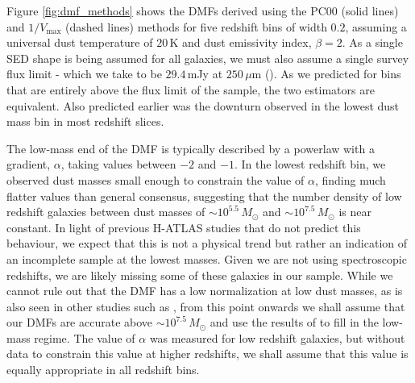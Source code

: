 Figure \ref{fig:dmf_methods} shows the DMFs derived using the PC00 (solid lines) and $1/V_{\textrm{max}}$ (dashed lines) methods for five redshift bins of width $0.2$, assuming a universal dust temperature of $20\,$K and dust emissivity index, $\beta = 2$. As a single SED shape is being assumed for all galaxies, we must also assume a single survey flux limit - which we take to be $29.4\,$mJy at $250\,\mu$m (\citealt{Valiante_2016}). As we predicted for bins that are entirely above the flux limit of the sample, the two estimators are equivalent. Also predicted earlier was the downturn observed in the lowest dust mass bin in most redshift slices.

The low-mass end of the DMF is typically described by a powerlaw with a gradient, $\alpha$, taking values between $-2$ and $-1$. In the lowest redshift bin, we observed dust masses small enough to constrain the value of $\alpha$, finding much flatter values than general consensus, suggesting that the number density of low redshift galaxies between dust masses of $\sim 10^{5.5}\,M_{\odot}$ and $\sim 10^{7.5}\,M_{\odot}$ is near constant. In light of previous H-ATLAS studies that do not predict this behaviour, we expect that this is not a physical trend but rather an indication of an incomplete sample at the lowest masses. Given we are not using spectroscopic redshifts, we are likely missing some of these galaxies in our sample. While we cannot rule out that the DMF has a low normalization at low dust masses, as is also seen in other studies such as \citealt{Dunne_2011}, from this point onwards we shall assume that our DMFs are accurate above $\sim 10^{7.5}\,M_{\odot}$ and use the results of \citealt{Beeston_2018} to fill in the low-mass regime. The \citealt{Beeston_2018} value of $\alpha$ was measured for low redshift galaxies, but without data to constrain this value at higher redshifts, we shall assume that this value is equally appropriate in all redshift bins.

